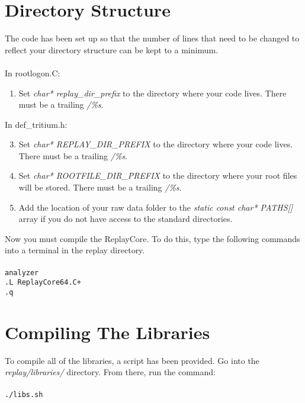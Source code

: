 \documentclass{report}
\begin{document}
\section{Directory Structure}
The code has been set up so that the number of lines that need to be changed to reflect your directory structure can be kept to a minimum.
\\\\
\noindent In rootlogon.C:
\begin{enumerate}
\item Set \textit{char* replay\_dir\_prefix} to the directory where your code lives. There must be a trailing \textit{/\%s}.
\end{enumerate}
In def\_tritium.h:
\begin{enumerate}
\setcounter{enumi}{2}
\item Set \textit{char* REPLAY\_DIR\_PREFIX} to the directory where your code lives. There must be a trailing \textit{/\%s}.
\item Set \textit{char* ROOTFILE\_DIR\_PREFIX} to the directory where your root files will be stored. There must be a trailing \textit{/\%s}.
\item Add the location of your raw data folder to the \textit{static const char* PATHS[]} array if you do not have access to the standard directories.
\end{enumerate}

Now you must compile the ReplayCore. To do this, type the following commands into a terminal in the replay directory.
\\\\
\texttt{analyzer\\
.L ReplayCore64.C+\\
.q}

\section{Compiling The Libraries}

To compile all of the libraries, a script has been provided. Go into the \textit{replay/libraries/} directory. From there, run the command:\\\\
\texttt{./libs.sh}
\end{document}
